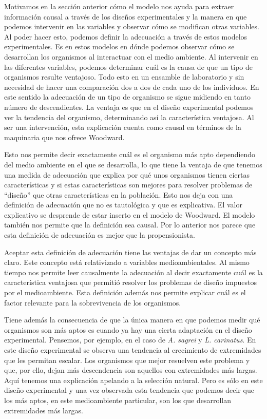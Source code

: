  Motivamos en la sección anterior cómo el modelo nos ayuda para extraer información causal a través de los diseños experimentales y la manera en que podemos intervenir en las variables y observar cómo se modifican otras variables. Al poder hacer esto, podemos definir la adecuación a través de estos modelos experimentales. Es en estos modelos en dónde podemos observar cómo se desarrollan los organismos al interactuar con el medio ambiente. Al intervenir en las diferentes variables, podemos determinar cuál es la causa de que un tipo de organismos resulte ventajoso. Todo esto en un ensamble de laboratorio y sin necesidad de hacer una comparación dos a dos de cada uno de los individuos. En este sentido la adecuación de un tipo de organismo se sigue midiendo en tanto número de descendientes. La ventaja es que en el diseño experimental podemos ver la tendencia del organismo, determinando así la característica ventajosa. Al ser una intervención, esta explicación cuenta como causal en términos de la maquinaria que nos ofrece Woodward.

 Esto nos permite decir exactamente cuál es el organismo más apto dependiendo del medio ambiente en el que se desarrolla, lo que tiene la ventaja de que tenemos una medida de adecuación que explica por qué unos organismos tienen ciertas características y si estas características son mejores para resolver problemas de ``diseño'' que otras características en la población. Esto nos deja con una definición de adecuación que no  es tautológica y que es  explicativa. El valor explicativo se desprende de estar inserto en el modelo de Woodward. El modelo también nos permite que la definición sea causal. Por lo anterior nos parece que esta definición de adecuación es mejor que la propensionista.

 Aceptar esta definición de adecuación tiene las ventajas de dar un concepto más claro. Este concepto está relativizado a variables medioambientales. Al mismo tiempo nos permite leer causalmente la adecuación al decir exactamente cuál es la característica ventajosa que permitió resolver los problemas de diseño impuestos por el medioambiente. Esta definición además nos permite explicar cuál es el factor relevante para la sobrevivencia de los organismos.

 Tiene además la consecuencia de que la única manera en que podemos medir qué organismos son más aptos es cuando ya hay una cierta adaptación en el diseño experimental. Pensemos, por ejemplo, en el caso de \emph{A. sagrei} y \emph{L. carinatus}. En este diseño experimental se observa una tendencia al crecimiento de extremidades que les permitan escalar. Los organismos que mejor resuelven este problema y que, por ello, dejan más descendencia son aquellos con extremidades más largas. Aquí tenemos una explicación apelando a la selección natural. Pero es sólo en este diseño experimental y una vez observada esta tendencia que podemos decir que los más aptos, en este medioambiente particular, son los que desarrollan extremidades más largas.


